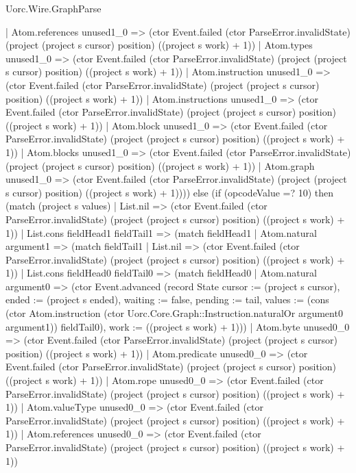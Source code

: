 \begin{lexlean}{Uorc.Wire.GraphParse}
\begin{semanticmodule}
{          | Atom.references unused1_0 => (ctor Event.failed (ctor ParseError.invalidState) (project (project s cursor) position) ((project s work) + 1))
          | Atom.types unused1_0 => (ctor Event.failed (ctor ParseError.invalidState) (project (project s cursor) position) ((project s work) + 1))
          | Atom.instruction unused1_0 => (ctor Event.failed (ctor ParseError.invalidState) (project (project s cursor) position) ((project s work) + 1))
          | Atom.instructions unused1_0 => (ctor Event.failed (ctor ParseError.invalidState) (project (project s cursor) position) ((project s work) + 1))
          | Atom.block unused1_0 => (ctor Event.failed (ctor ParseError.invalidState) (project (project s cursor) position) ((project s work) + 1))
          | Atom.blocks unused1_0 => (ctor Event.failed (ctor ParseError.invalidState) (project (project s cursor) position) ((project s work) + 1))
          | Atom.graph unused1_0 => (ctor Event.failed (ctor ParseError.invalidState) (project (project s cursor) position) ((project s work) + 1)))) else (if (opcodeValue =? 10) then (match (project s values)
        | List.nil => (ctor Event.failed (ctor ParseError.invalidState) (project (project s cursor) position) ((project s work) + 1))
        | List.cons fieldHead1 fieldTail1 => (match fieldHead1
          | Atom.natural argument1 => (match fieldTail1
            | List.nil => (ctor Event.failed (ctor ParseError.invalidState) (project (project s cursor) position) ((project s work) + 1))
            | List.cons fieldHead0 fieldTail0 => (match fieldHead0
              | Atom.natural argument0 => (ctor Event.advanced (record State {cursor := (project s cursor), ended := (project s ended), waiting := false, pending := tail, values := (cons (ctor Atom.instruction (ctor Uorc.Core.Graph::Instruction.naturalOr argument0 argument1)) fieldTail0), work := ((project s work) + 1)}))
              | Atom.byte unused0_0 => (ctor Event.failed (ctor ParseError.invalidState) (project (project s cursor) position) ((project s work) + 1))
              | Atom.predicate unused0_0 => (ctor Event.failed (ctor ParseError.invalidState) (project (project s cursor) position) ((project s work) + 1))
              | Atom.rope unused0_0 => (ctor Event.failed (ctor ParseError.invalidState) (project (project s cursor) position) ((project s work) + 1))
              | Atom.valueType unused0_0 => (ctor Event.failed (ctor ParseError.invalidState) (project (project s cursor) position) ((project s work) + 1))
              | Atom.references unused0_0 => (ctor Event.failed (ctor ParseError.invalidState) (project (project s cursor) position) ((project s work) + 1))
}
\end{semanticmodule}
\end{lexlean}
